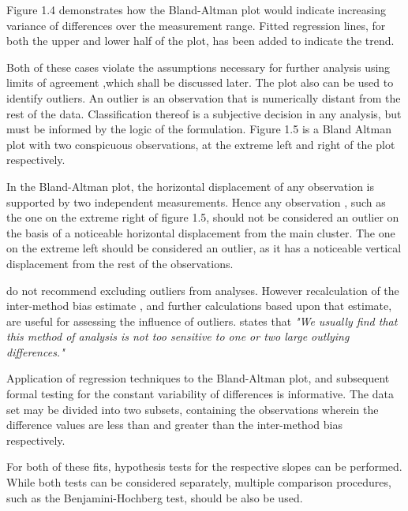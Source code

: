 \documentclass[Main.tex]{subfiles}
\begin{document}
	Figure 1.4 demonstrates how the Bland-Altman plot would indicate
	increasing variance of differences over the measurement range.
	Fitted regression lines, for both the upper and lower half of the
	plot, has been added to indicate the trend. 
	
Both of these cases violate the assumptions
	necessary for further analysis using limits of agreement ,which
	shall be discussed later. The plot also can be used to identify
	outliers. An outlier is an observation that is numerically distant
	from the rest of the data. Classification thereof is a subjective
	decision in any analysis, but must be informed by the logic of the
	formulation. Figure 1.5 is a Bland Altman plot with two
	conspicuous observations, at the extreme left and right of the
	plot respectively.
	
	
	
	In the Bland-Altman plot, the horizontal displacement of any
	observation is supported by two independent measurements. Hence
	any observation , such as the one on the extreme right of figure
	1.5, should not be considered an outlier on the basis of a
	noticeable horizontal displacement from the main cluster. The one
	on the extreme left should be considered an outlier, as it has a
	noticeable vertical displacement from the rest of the
	observations.
	
	\citet*{BA99} do not recommend excluding outliers from analyses.
	However recalculation of the inter-method bias estimate , and
	further calculations based upon that estimate, are useful for
	assessing the influence of outliers.\citep{BA99} states that
	\emph{"We usually find that this method of analysis is not too
		sensitive to one or two large outlying differences."}

	Application of regression techniques to the Bland-Altman 
	plot, and subsequent formal testing for the constant variability of differences is informative. The data set may be divided into two subsets, containing the observations wherein the difference values are less than and greater than the inter-method bias respectively.
	

	For both of these fits, hypothesis tests for the respective slopes
	can be performed. While both tests can be considered separately,
	multiple comparison procedures, such as the Benjamini-Hochberg
	\citep{BH} test, should be also be used.
	
\end{document}

